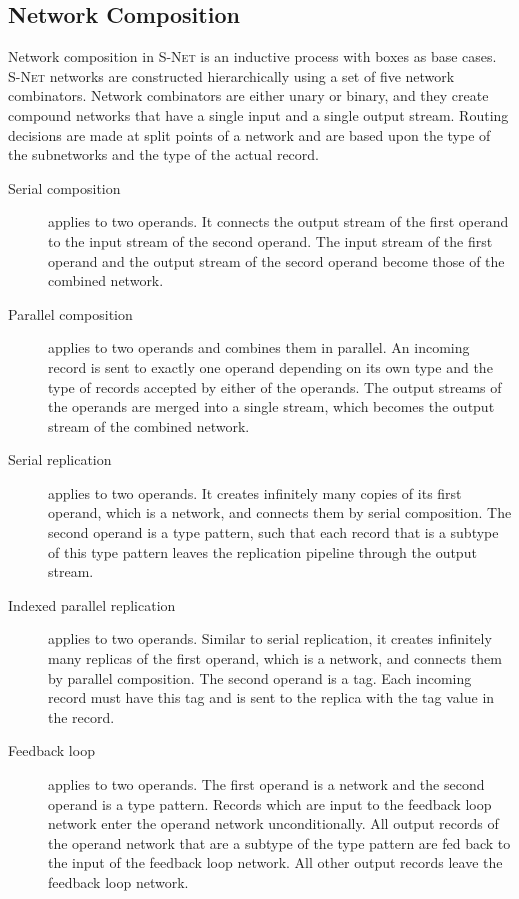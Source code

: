     \subsection*{Network Composition}
Network composition in \textsc{S-Net} is an inductive process with boxes as base cases. \textsc{S-Net} networks are constructed hierarchically using a set of five network combinators. Network combinators are either unary or binary, and they create compound networks that have a single input and a single output stream. Routing decisions are made at split points of a network and are based upon the type of the subnetworks and the type of the actual record.

    \begin{description}
    \item[Serial composition] applies to two operands. It connects the output stream of the first operand to the input stream of the second operand. The input stream of the first operand and the output stream of the secord operand become those of the combined network.

    \item[Parallel composition] applies to two operands and combines them in parallel. An incoming record is sent to exactly one operand depending on its own type and the type of records accepted by either of the operands. The output streams of the operands are merged into a single stream, which becomes the output stream of the combined network.

    \item[Serial replication] applies to two operands. It creates infinitely many copies of its first operand, which is a network, and connects them by serial composition. The second operand is a type pattern, such that each record that is a subtype of this type pattern leaves the replication pipeline through the output stream.

    \item[Indexed parallel replication] applies to two operands. Similar to serial replication, it creates infinitely many replicas of the first operand, which is a network, and connects them by parallel composition. The second operand is a tag. Each incoming record must have this tag and is sent to the replica with the tag value in the record.

    \item[Feedback loop] applies to two operands. The first operand is a network and the second operand is a type pattern. Records which are input to the feedback loop network enter the operand network unconditionally. All output records of the operand network that are a subtype of the type pattern are fed back to the input of the feedback loop network. All other output records leave the feedback loop network.

    \end{description}

